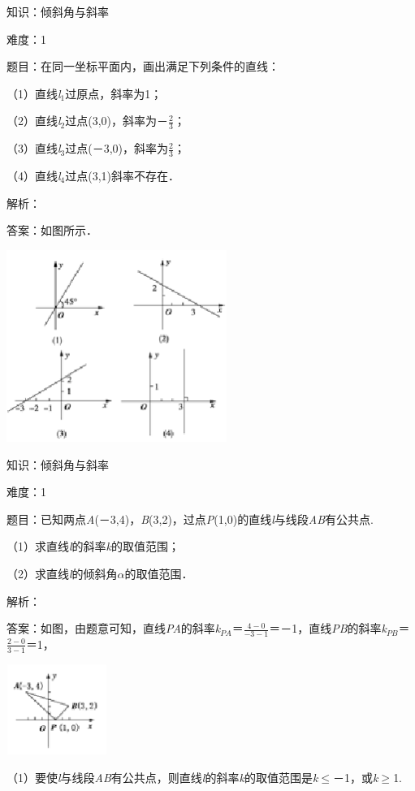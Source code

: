 \documentclass{article} %
\begin{document}
知识：倾斜角与斜率

难度：1

题目：在同一坐标平面内，画出满足下列条件的直线：

（1）直线\textit{l}${}_{1}$过原点，斜率为1；

（2）直线\textit{l}${}_{2}$过点(3,0)，斜率为－$\frac{2}{3}$；

（3）直线\textit{l}${}_{3}$过点(－3,0)，斜率为$\frac{2}{3}$；

（4）直线\textit{l}${}_{4}$过点(3,1)斜率不存在．

解析：

答案：如图所示．

\includegraphics*[width=2.82in, height=2.46in, keepaspectratio=false]{image270}

知识：倾斜角与斜率

难度：1

题目：已知两点\textit{A}(－3,4)，\textit{B}(3,2)，过点\textit{P}(1,0)的直线\textit{l}与线段\textit{AB}有公共点.

（1）求直线\textit{l}的斜率\textit{k}的取值范围；

（2）求直线\textit{l}的倾斜角\textit{$\alpha$}的取值范围．

解析：

答案：如图，由题意可知，直线\textit{PA}的斜率\textit{k${}_{PA}$}＝$\frac{4-0}{-3-1}$＝－1，直线\textit{PB}的斜率\textit{k${}_{PB}$}＝$\frac{2-0}{3-1}$＝1，

\includegraphics*[width=1.29in, height=1.16in, keepaspectratio=false]{image271}

（1）要使\textit{l}与线段\textit{AB}有公共点，则直线\textit{l}的斜率\textit{k}的取值范围是\textit{k}$\mathrm{\le}$－1，或\textit{k}$\mathrm{\ge}$1.
\end{document}
